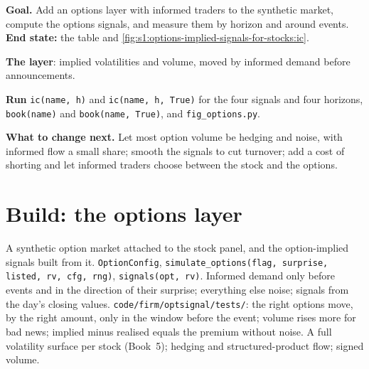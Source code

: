 \begin{tutorial}
\textbf{Goal.} Add an options layer with informed traders to the synthetic market, compute the options signals, and measure them by horizon and around
events. \textbf{End state:} the table and \cref{fig:s1:options-implied-signals-for-stocks:ic}.
\begin{tutsteps}
\item \textbf{The layer}: implied volatilities and volume, moved by informed demand before announcements.
\label{lst:s1:options-implied-signals-for-stocks:layer}
\item \textbf{Run} \texttt{ic(name, h)} and \texttt{ic(name, h, True)} for the four signals and four horizons, \texttt{book(name)} and \texttt{book(name,
True)}, and \texttt{fig\_options.py}.
\end{tutsteps}
\textbf{What to change next.} Let most option volume be hedging and noise, with informed flow a small share; smooth the signals to cut turnover; add a
cost of shorting and let informed traders choose between the stock and the options.
\end{tutorial}

\section{Build: the options layer}\label{bld:s1:options-implied-signals-for-stocks:optsignal}

\begin{build}
 A synthetic option market attached to the stock panel, and the option-implied signals built from it.
 \texttt{OptionConfig}, \texttt{simulate\_options(flag, surprise, listed, rv, cfg, rng)}, \texttt{signals(opt, rv)}.
 Informed demand only before events and in the direction of their surprise; everything else noise; signals from the day's closing values.
 \texttt{code/firm/optsignal/tests/}: the right options move, by the right amount, only in the window before the event; volume rises
more for bad news; implied minus realised equals the premium without noise.
 A full volatility surface per stock (Book~5); hedging and structured-product flow; signed volume.
\end{build}

